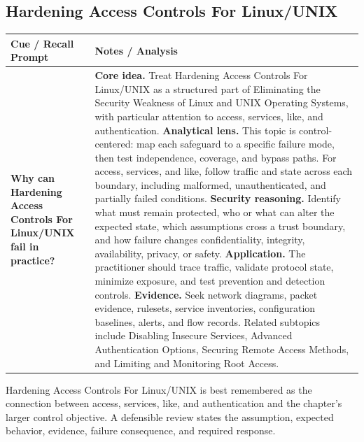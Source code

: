 \documentclass[11pt]{article}
\newcommand{\CornellHeader}{%
\rowcolor{Navy}\color{white}\bfseries Cue / Recall Prompt & \color{white}\bfseries Notes / Analysis\\\hline}
\newcommand{\CornellRow}[2]{%
\cellcolor{CueGray}\RaggedRight\textbf{#1} & \RaggedRight #2\\\hline}
\begin{document}
\subsection*{Hardening Access Controls For Linux/UNIX}
\begin{longtable}{>{\RaggedRight\arraybackslash}p{}|>{\RaggedRight\arraybackslash}p{}}
\CornellHeader
\CornellRow{Why can Hardening Access Controls For Linux/UNIX fail in practice?}{\textbf{Core idea.} Treat Hardening Access Controls For Linux/UNIX as a structured part of Eliminating the Security Weakness of Linux and UNIX Operating Systems, with particular attention to access, services, like, and authentication. \textbf{Analytical lens.} This topic is control-centered: map each safeguard to a specific failure mode, then test independence, coverage, and bypass paths. For access, services, and like, follow traffic and state across each boundary, including malformed, unauthenticated, and partially failed conditions. \textbf{Security reasoning.} Identify what must remain protected, who or what can alter the expected state, which assumptions cross a trust boundary, and how failure changes confidentiality, integrity, availability, privacy, or safety. \textbf{Application.} The practitioner should trace traffic, validate protocol state, minimize exposure, and test prevention and detection controls. \textbf{Evidence.} Seek network diagrams, packet evidence, rulesets, service inventories, configuration baselines, alerts, and flow records. Related subtopics include Disabling Insecure Services, Advanced Authentication Options, Securing Remote Access Methods, and Limiting and Monitoring Root Access.}
\end{longtable}
\begin{topicsummary}
Hardening Access Controls For Linux/UNIX is best remembered as the connection between access, services, like, and authentication and the chapter's larger control objective. A defensible review states the assumption, expected behavior, evidence, failure consequence, and required response.
\end{topicsummary}
\end{document}
